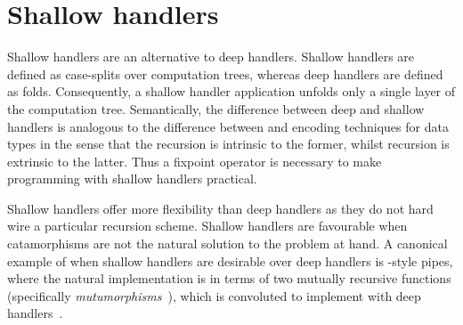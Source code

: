 \documentclass[12pt,phd,lfcs,twoside,openright,logo,leftchapter,normalheadings]{infthesis}
\theoremstyle{plain}
\theoremstyle{definition}
\newtheorem{example}{Example}[chapter]
\begin{document}





\section{Shallow handlers}
\label{sec:unary-shallow-handlers}

Shallow handlers are an alternative to deep handlers. Shallow handlers
are defined as case-splits over computation trees, whereas deep
handlers are defined as folds. Consequently, a shallow handler
application unfolds only a single layer of the computation tree.
%
Semantically, the difference between deep and shallow handlers is
analogous to the difference between \citet{Church41} and
\citet{Scott62} encoding techniques for data types in the sense that
the recursion is intrinsic to the former, whilst recursion is
extrinsic to the latter.
%
Thus a fixpoint operator is necessary to make programming with shallow
handlers practical.

Shallow handlers offer more flexibility than deep handlers as they do
not hard wire a particular recursion scheme. Shallow handlers are
favourable when catamorphisms are not the natural solution to the
problem at hand.
%
A canonical example of when shallow handlers are desirable over deep
handlers is \UNIX{}-style pipes, where the natural implementation is
in terms of two mutually recursive functions (specifically
\emph{mutumorphisms}~\cite{Fokkinga90}), which is convoluted to
implement with deep
handlers~\cite{KammarLO13,HillerstromL18,HillerstromLA20}.
\end{document}

